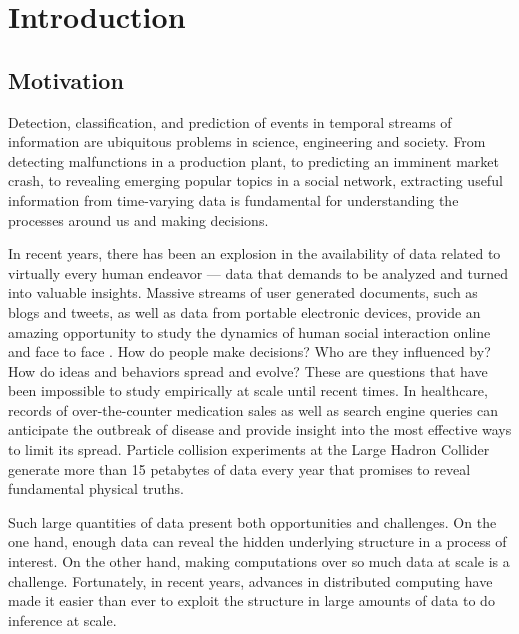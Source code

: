 \chapter{Introduction}
\label{ch:intro}
\section{Motivation}

Detection, classification, and prediction of events in temporal streams of
information are ubiquitous problems in science, engineering and society. From
detecting malfunctions in a production plant, to predicting an imminent market
crash, to revealing emerging popular topics in a social network, extracting
useful information from time-varying data is fundamental for understanding the
processes around us and making decisions.

In recent years, there has been an explosion in the availability of data related
to virtually every human endeavor --- data that demands to be analyzed and
turned into valuable insights. Massive streams of user generated documents, such
as blogs and tweets, as well as data from portable electronic devices, provide
an amazing opportunity to study the dynamics of human social interaction online
and face to face \cite{Pentland}. How do people make decisions? Who are they
influenced by? How do ideas and behaviors spread and evolve? These are questions
that have been impossible to study empirically at scale until recent times. In
healthcare, records of over-the-counter medication sales
\cite{NationalRetailDataMonitor} as well as search engine queries can anticipate
the outbreak of disease and provide insight into the most effective ways to
limit its spread. Particle collision experiments at the Large Hadron Collider
generate more than 15 petabytes of data every year that promises to reveal
fundamental physical truths.

Such large quantities of data present both opportunities and challenges. On the
one hand, enough data can reveal the hidden underlying structure in a process of
interest. On the other hand, making computations over so much data at scale is a
challenge. Fortunately, in recent years, advances in distributed computing have
made it easier than ever to exploit the structure in large amounts of data to do
inference at scale.


